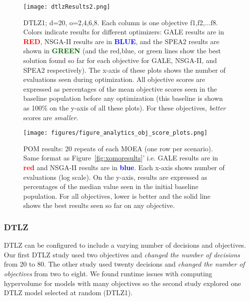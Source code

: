 \documentclass[10pt,journal,compsoc]{IEEEtran}
\newcommand{\fig}[1]{Figure~\ref{fig:#1}}
\begin{document}
 
\begin{figure*}[!t]
\texttt{[image: dtlzResults2.png]}
\caption{DTLZ1; d=20, o=2,4,6,8.
Each column is one objective f1,f2,...f8. Colors indicate results
for different optimizers:
GALE results are in 
\textcolor{red}{{\bf RED}},
NSGA-II results are in 
 \textcolor{blue}{{\bf BLUE}},
and the SPEA2 results are shown in 
  \textcolor{darkgreen}{{\bf GREEN}}
(and the 
red,blue, or green lines show the best solution found so far for each
objective for GALE, NSGA-II, and SPEA2 respectively). 
The x-axis of these
plots shows the number of evaluations seen during optimization.
All objective scores are expressed as percentages
of the mean objective scores seen in the baseline population before any optimization
(this baseline is shown as 100\% on the y-axis of all these plots). 
For these objectives, {\em better} scores are {\em smaller}.
}\label{fig:o2468}
\end{figure*}


 




\begin{figure*}
 \texttt{[image: figures/figure\_analytics\_obj\_score\_plots.png]}
\caption{POM results: 20 repeats of each MOEA (one row
per scenario). Same format as \fig{xomoresults}' i.e.
GALE results are in 
\textcolor{red}{{\bf red}}
and NSGA-II results are in 
 \textcolor{blue}{{\bf blue}}. Each x-axis shows number of evaluations (log scale).
On the y-axis, results are expressed
as percentages of the median value seen in the  initial baseline population. 
For all objectives, lower is better and the solid line shows
the best results seen so far on any objective.    }
\label{fig:zdt1objspace}
\end{figure*}




\subsubsection{DTLZ}

 DTLZ  can be configured to include a varying number of decisions
and objectives.  
Our first DTLZ study used two objectives and  {\em changed the number of decisions} from 20 to 80. The other study used twenty decisions and  {\em changed
the number of objectives} from two to eight. We found
 runtime issues with  computing hypervolume for models with many objectives
 so  the  second study  explored one DTLZ model selected at random (DTLZ1).
\end{document}
